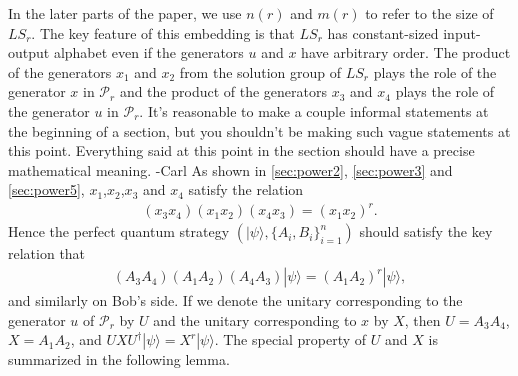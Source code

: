 \documentclass[11pt,letterpaper]{article}
\newcommand{\ket}[1]{|#1\rangle}
\newcommand{\ct}{^{\dagger}}
\newcommand{\1}{\mathbb{1}}
\newcommand{\Pg}{\mathcal{P}}
\newcommand{\LS}{LS}
\newcommand{\nr}{n(r)}
\newcommand{\mr}{m(r)}
\def\carl#1{{\color{blue} #1 -Carl}}
\theoremstyle{definition}
\begin{document}
In the later parts of the paper, we use $\nr$ and $\mr$ to refer to the size of $\LS_r$.
The key feature of this embedding is that $\LS_r$ has constant-sized input-output alphabet
even if the generators $u$ and $x$ have arbitrary order. 
The product of the generators $x_1$ and $x_2$ from the solution group of $\LS_r$ plays the role 
of the generator $x$ in $\Pg_r$ and the product of the generators $x_3$ and $x_4$ plays the role
of the generator $u$ in $\Pg_r$.   \carl{It's reasonable to make a couple informal statements
at the beginning of a section, but you shouldn't be making
such vague statements at this point.  Everything said at this point in the section should have a precise mathematical
meaning.}
As shown in \cref{sec:power2}, \cref{sec:power3} and \cref{sec:power5}, 
$x_1$,$x_2$,$x_3$ and $x_4$ satisfy the relation
\begin{align}
	(x_3x_4)(x_1x_2)(x_4x_3) = (x_1x_2)^r.
\end{align}
Hence the perfect quantum strategy $(\ket{\psi}, \{A_i, B_i\}_{i=1}^n)$ should satisfy 
the key relation that 
\begin{align}
	(A_3A_4) (A_1A_2)(A_4A_3) \ket{\psi} = (A_1A_2)^r\ket{\psi}, 
\end{align}
and similarly on Bob's side.
If we denote the unitary corresponding to the generator $u$ of $\Pg_r$ by $U$ and the unitary
corresponding to $x$ by $X$, then $U = A_3A_4$, $X= A_1A_2$, and 
$UXU\ct \ket{\psi} = X^r \ket{\psi}$.
The special property of $U$ and $X$ is summarized in the following lemma. 
\end{document}
